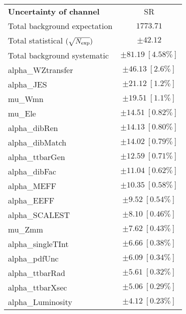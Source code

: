 
\begin{table}
\begin{center}
\setlength{\tabcolsep}{0.0pc}
\begin{tabular*}{\textwidth}{@{\extracolsep{\fill}}lc}
\noalign{\smallskip}\hline\noalign{\smallskip}
{\bf Uncertainty of channel}                                    & SR            \\
\noalign{\smallskip}\hline\noalign{\smallskip}
Total background expectation             &  $1773.71$       \\
\noalign{\smallskip}\hline\noalign{\smallskip}
Total statistical $(\sqrt{N_{\rm exp}})$              & $\pm 42.12$       \\
Total background systematic               & $\pm 81.19\ [4.58\%] $             \\
\noalign{\smallskip}\hline\noalign{\smallskip}
\noalign{\smallskip}\hline\noalign{\smallskip}
alpha\_WZtransfer         & $\pm 46.13\ [2.6\%] $       \\
alpha\_JES         & $\pm 21.12\ [1.2\%] $       \\
mu\_Wmn         & $\pm 19.51\ [1.1\%] $       \\
mu\_Ele         & $\pm 14.51\ [0.82\%] $       \\
alpha\_dibRen         & $\pm 14.13\ [0.80\%] $       \\
alpha\_dibMatch         & $\pm 14.02\ [0.79\%] $       \\
alpha\_ttbarGen         & $\pm 12.59\ [0.71\%] $       \\
alpha\_dibFac         & $\pm 11.04\ [0.62\%] $       \\
alpha\_MEFF         & $\pm 10.35\ [0.58\%] $       \\
alpha\_EEFF         & $\pm 9.52\ [0.54\%] $       \\
alpha\_SCALEST         & $\pm 8.10\ [0.46\%] $       \\
mu\_Zmm         & $\pm 7.62\ [0.43\%] $       \\
alpha\_singleTInt         & $\pm 6.66\ [0.38\%] $       \\
alpha\_pdfUnc         & $\pm 6.09\ [0.34\%] $       \\
alpha\_ttbarRad         & $\pm 5.61\ [0.32\%] $       \\
alpha\_ttbarXsec         & $\pm 5.06\ [0.29\%] $       \\
alpha\_Luminosity         & $\pm 4.12\ [0.23\%] $       \\

\end{tabular*}
\end{center}
\end{table}
